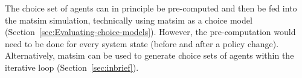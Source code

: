 The choice set of agents can in principle be pre-computed and then be fed into the \acrshort{matsim} simulation, technically using \gls{matsim} as a choice model (Section~\ref{sec:Evaluating-choice-models}).
%
However, the pre-computation would need to be done for every system state (\eg before and after a policy change). Alternatively, \acrshort{matsim} can be used to generate choice sets of agents within the iterative loop (Section~\ref{sec:inbrief}).
%
%

% 
% 
% 
